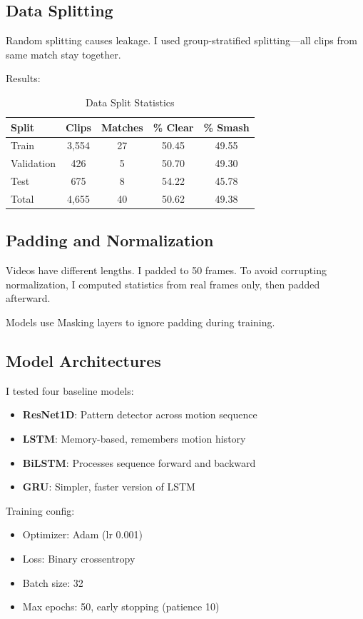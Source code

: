 \documentclass[11pt,a4paper]{article}
\begin{document}
\subsection{Data Splitting}

Random splitting causes leakage. I used group-stratified splitting---all clips from same match stay together.

Results:

\begin{table}[H]
\centering
\caption{Data Split Statistics}
\begin{tabular}{lcccc}
\toprule
Split & Clips & Matches & \% Clear & \% Smash \\
\midrule
Train & 3,554 & 27 & 50.45 & 49.55 \\
Validation & 426 & 5 & 50.70 & 49.30 \\
Test & 675 & 8 & 54.22 & 45.78 \\
Total & 4,655 & 40 & 50.62 & 49.38 \\
\bottomrule
\end{tabular}
\end{table}

\subsection{Padding and Normalization}

Videos have different lengths. I padded to 50 frames. To avoid corrupting normalization, I computed statistics from real frames only, then padded afterward.

Models use Masking layers to ignore padding during training.

\subsection{Model Architectures}

I tested four baseline models:

\begin{itemize}
\item \textbf{ResNet1D}: Pattern detector across motion sequence
\item \textbf{LSTM}: Memory-based, remembers motion history
\item \textbf{BiLSTM}: Processes sequence forward and backward
\item \textbf{GRU}: Simpler, faster version of LSTM
\end{itemize}

Training config:
\begin{itemize}
\item Optimizer: Adam (lr 0.001)
\item Loss: Binary crossentropy
\item Batch size: 32
\item Max epochs: 50, early stopping (patience 10)
\end{itemize}
\end{document}
